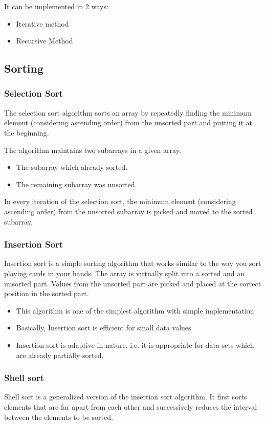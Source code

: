 \documentclass[11pt]{article}
\begin{document}
It can be implemented in 2 ways:
\begin{itemize}
	\item Iterative method
	\item Recursive Method
\end{itemize}
\subsection{Sorting}
\subsubsection{Selection Sort}
The selection sort algorithm sorts an array by repeatedly finding the minimum element (considering ascending order) from the unsorted part and putting it at the beginning.

The algorithm maintains two subarrays in a given array.
\begin{itemize}
	\item The subarray which already sorted.
	\item The remaining subarray was unsorted.
\end{itemize}
In every iteration of the selection sort, the minimum element (considering ascending order) from the unsorted subarray is picked and moved to the sorted subarray.
\subsubsection{Insertion  Sort}
Insertion sort is a simple sorting algorithm that works similar to the way you sort playing cards in your hands. The array is virtually split into a sorted and an unsorted part. Values from the unsorted part are picked and placed at the correct position in the sorted part.

\begin{itemize}
	\item This algorithm is one of the simplest algorithm with simple implementation
	\item Basically, Insertion sort is efficient for small data values
	\item Insertion sort is adaptive in nature, i.e. it is appropriate for data sets which are already partially sorted.

\end{itemize}

\subsubsection{Shell sort}
Shell sort is a generalized version of the insertion sort algorithm. It first sorts elements that are far apart from each other and successively reduces the interval between the elements to be sorted.
\end{document}
